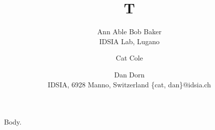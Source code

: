 \documentclass{article}
\begin{document}
\title{T}
\author{Ann Able \quad Bob Baker\\
IDSIA Lab, Lugano
\and Cat Cole \and Dan Dorn\\
\small{IDSIA, 6928 Manno, Switzerland {\{cat, dan\}@idsia.ch}}}
\maketitle
Body.
\end{document}
